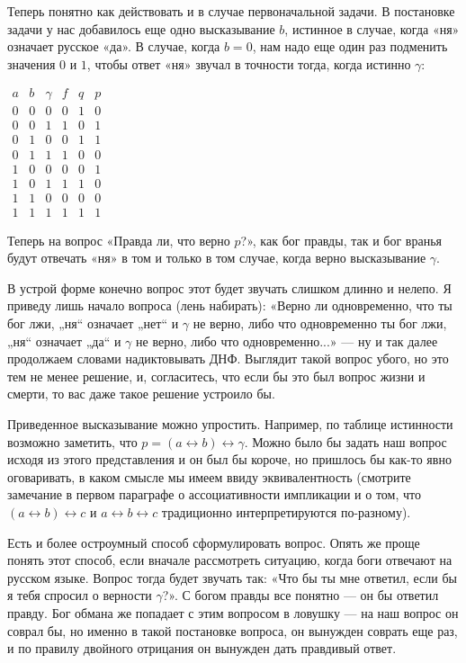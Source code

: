 Теперь понятно как действовать и в случае первоначальной задачи. В постановке задачи у нас добавилось еще одно высказывание $b$, истинное в случае, когда «ня» означает русское «да». В случае, когда $b = 0$, нам надо еще один раз подменить значения $0$ и $1$, чтобы ответ «ня» звучал в точности тогда, когда истинно $\gamma$:

$\begin{array}{ccc|ccc}a&b&\gamma&f&q&p\\ \hline 0&0&0&0&1&0\\0&0&1&1&0&1\\0&1&0&0&1&1\\0&1&1&1&0&0\\1&0&0&0&0&1\\1&0&1&1&1&0\\1&1&0&0&0&0\\1&1&1&1&1&1\end{array}$

Теперь на вопрос «Правда ли, что верно $p$?», как бог правды, так и бог вранья будут отвечать «ня» в том и только в том случае, когда верно высказывание $\gamma$.

В устрой форме конечно вопрос этот будет звучать слишком длинно и нелепо. Я приведу лишь начало вопроса (лень набирать): «Верно ли одновременно, что ты бог лжи, „ня“ означает „нет“ и $\gamma$ не верно, либо что одновременно ты бог лжи, „ня“ означает „да“ и $\gamma$ не верно, либо что одновременно...» — ну и так далее продолжаем словами надиктовывать ДНФ. Выглядит такой вопрос убого, но это тем не менее решение, и, согласитесь, что если бы это был вопрос жизни и смерти, то вас даже такое решение устроило бы.

Приведенное высказывание можно упростить. Например, по таблице истинности возможно заметить, что $p = (a \leftrightarrow b) \leftrightarrow \gamma$. Можно было бы задать наш вопрос исходя из этого представления и он был бы короче, но пришлось бы как-то явно оговаривать, в каком смысле мы имеем ввиду эквивалентность (смотрите замечание в первом параграфе о ассоциативности импликации и о том, что $(a\leftrightarrow b)\leftrightarrow c$ и $a \leftrightarrow b \leftrightarrow c$ традиционно интерпретируются по-разному).

Есть и более остроумный способ сформулировать вопрос. Опять же проще понять этот способ, если вначале рассмотреть ситуацию, когда боги отвечают на русском языке. Вопрос тогда будет звучать так: «Что бы ты мне ответил, если бы я тебя спросил о верности $\gamma$?». С богом правды все понятно — он бы ответил правду. Бог обмана же попадает с этим вопросом в ловушку — на наш вопрос он соврал бы, но именно в такой постановке вопроса, он вынужден соврать еще раз, и по правилу двойного отрицания он вынужден дать правдивый ответ.

